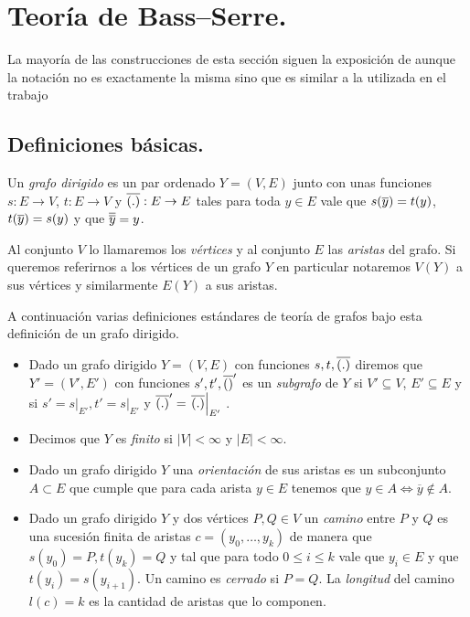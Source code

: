 \documentclass[tesis.tex]{subfiles}
\begin{document}
\chapter{Teoría de Bass--Serre.}

La mayoría de las construcciones de esta sección siguen la exposición de \cite{serre2002trees} aunque la notación no es exactamente la misma sino que es similar a la utilizada en el trabajo \cite{diekert2017context} 

\section{Definiciones básicas.}


\begin{deff}
	Un \emph{grafo dirigido} es un par ordenado $Y= (V,E)$ junto con unas funciones
	$s:E \to V$, $t:E \to V$ y $\overline{(.)}:E \to E$ tales para toda $y \in E$ vale que $s(\overline{y}) = t(y)$, $t(\overline y) = s(y)$ y que $\overline{\overline y} = y$.
	
	Al conjunto $V$ lo llamaremos los \emph{vértices} y al conjunto $E$ las \emph{aristas} del grafo.
	Si queremos referirnos a los vértices de un grafo $Y$ en particular notaremos $V(Y)$ a sus vértices y similarmente $E(Y)$ a sus aristas.
	
	A continuación varias definiciones estándares de teoría de grafos bajo esta definición de un grafo dirigido.
	\begin{itemize}

		\item Dado un grafo dirigido $Y=(V,E)$ con funciones $s,t, \overline{(.)}$ diremos que $Y'=(V',E')$ con funciones $s',t',\overline{()}'$ es un \emph{subgrafo} de $Y$ si $V' \subseteq V$, $E' \subseteq E$ y si $s'=\left. s \right|_{E'}, t' = \left. s \right|_{E'}$ y $\overline{(.)}' = \left. \overline{(.)} \right|_{E'}$ .
		
		\item Decimos que $Y$ es \emph{finito} si $|V| < \infty$ y $|E| < \infty$.	
		
		\item Dado un grafo dirigido $Y$ una \emph{orientación} de sus aristas es un subconjunto $A \subset E$ que cumple que para cada arista $y \in E$ tenemos que $y \in A \iff \overline y \notin A$.	
		
		\item Dado un grafo dirigido $Y$ y dos vértices $P, Q \in V$ un \emph{camino}  entre $P$ y $Q$ es una sucesión finita de aristas $c = (y_0, \dots, y_k)$ de manera que $s(y_0) = P, t(y_k) = Q$ y tal que para todo $0 \le i \le k$ vale que $y_i \in E$ y que $t(y_i) = s(y_{i+1})$.
		Un camino es \emph{cerrado} si $P = Q$.
		La \emph{longitud} del camino $l(c) = k$ es la cantidad de aristas que lo componen.
		

\end{itemize}
\end{deff}
\end{document}
